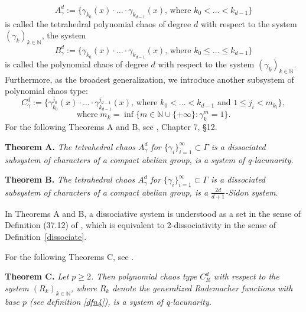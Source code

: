 \documentclass[12pt]{article}
\begin{document}
	\begin{equation} \label{Aphid}
		A_{\gamma}^d :=\{\gamma_{k_0} (x) \cdot \ldots \cdot \gamma_{k_{d-1}}(x) 
		\text{, where $k_0< ... < k_{d-1}$}\}
	\end{equation}
	is called the tetrahedral polynomial chaos of degree $d$ with respect to the system $(\gamma_k)_{k\in\mathbb{N}}$, the system 
	\begin{equation} \label{Bphid}
		B_{\gamma}^d :=\{\gamma_{k_0} (x) \cdot \ldots \cdot \gamma_{k_{d-1}}(x) 
		\text{, where $k_0\le ... \le k_{d-1}$}\}
	\end{equation}
	is called the polynomial chaos of degree $d$ with respect to the system $(\gamma_k)_{k\in\mathbb{N}}$. Furthermore, as the broadest generalization, we introduce another subsystem of polynomial chaos type: 
	\begin{equation} \label{Cphid}
		C_{\gamma}^d :=\{\gamma_{k_0}^{j_0} (x) \cdot \ldots \cdot \gamma_{k_{d-1}}^{j_{d-1}}(x) 
		\text{, where $k_0 < ... < k_{d-1}$ and $1 \le j_i < m_{k_i}$}\},
	\end{equation}
	\begin{equation} \label{m_k}
		\text{where} \; m_k = \inf\{m\in \mathbb{N} \cup \{+\infty\} \colon \gamma_k^m =1\}.
	\end{equation}	
	For the following Theorems A and B, see \cite{Blei}, Chapter 7, \S 12.
	
	{\bf Theorem A.} { \it The tetrahedral chaos $A_{\gamma}^{d}$ for $\{\gamma_{i}\}_{i=1}^{\infty} \subset \Gamma$ is a dissociated subsystem of characters of a compact abelian group, is a system of q-lacunarity.}
	
	{\bf Theorem B.} { \it The tetrahedral chaos $A_{\gamma}^{d}$ for $\{\gamma_{i}\}_{i=1}^{\infty} \subset \Gamma$ is a dissociated subsystem of characters of a compact abelian group, is a $\frac{2d}{d+1}$-Sidon system.}

    In Theorems A and B, a dissociative system is understood as a set in the sense of Definition (37.12) of \cite{HewRoss}, which is equivalent to 2-dissociativity in the sense of Definition~\ref{dissociate}.
    
	For the following Theorems C, see \cite{KazPlo25}.
	
	{\bf Theorem C.} { \it Let $p \ge 2$. Then polynomial chaos type $C_{R}^d$  with respect to the system $(R_k)_{k\in\mathbb{N}}$, where $R_k$ denote the generalized Rademacher functions with base $p$ (see definition \ref{dfn4}), is a system of q-lacunarity.}
	
\end{document}
